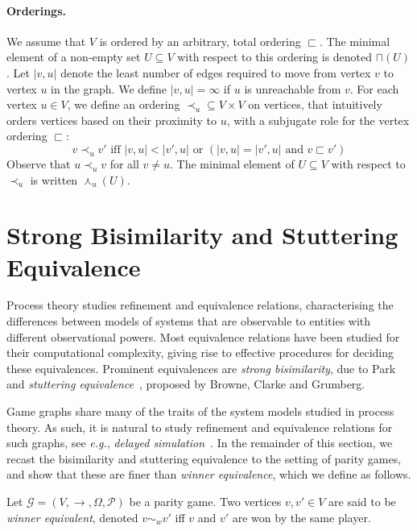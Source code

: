 \documentclass[a4paper]{llncs}
\newcommand{\eg}{\textit{e.g.}\xspace}
\newcommand{\game}{\ensuremath{\mathcal{G}}\xspace}
\newcommand{\priority}{\ensuremath{\Omega}\xspace}
\newcommand{\getplayername}{\ensuremath{\mathcal{P}}}
\newcommand{\winner}{\ensuremath{\sim_w}}
\newcommand{\vertexorder}{\ensuremath{\sqsubset}}
\newcommand{\targetorder}[1]{\ensuremath{\prec_{#1}}}
\newcommand{\vertexordermin}{\sqcap}
\newcommand{\targetordermin}[1]{\curlywedge_{#1}}
\begin{document}
\paragraph{Orderings.} We assume that $V$ is ordered by an arbitrary,
total ordering $\vertexorder$. The minimal element of a non-empty
set $U\subseteq V$ with respect to this ordering is denoted
$\vertexordermin(U)$.  Let $|v,u|$ denote the least number of edges
required to move from vertex $v$ to vertex $u$ in the graph. We define
$|v,u|=\infty$ if $u$ is unreachable from $v$. For each vertex $u \in V$,
we define an ordering $\targetorder{u} \subseteq V \times V$ on vertices,
that intuitively orders vertices based on their proximity to $u$, with a
subjugate role for the vertex ordering $\vertexorder$:
$$
v \targetorder{u} v' \textrm{ iff } |v,u| < |v',u|
\textrm{ or } (|v,u| = |v',u| \textrm{ and } v \vertexorder v')
$$
Observe that $u \targetorder{u} v$ for all $v \not= u$. The minimal
element of $U \subseteq V$ with respect to $\targetorder{u}$ is written
$\targetordermin{u}(U)$.


\section{Strong Bisimilarity and Stuttering Equivalence}
\label{sec:equivalences}

Process theory studies refinement and equivalence
relations, characterising the differences between models of systems that
are observable to entities with different observational powers. Most equivalence
relations have been studied for their computational complexity, giving
rise to effective procedures for deciding these equivalences.  Prominent
equivalences are \emph{strong bisimilarity}, due to Park~\cite{Par:81}
and \emph{stuttering equivalence}~\cite{BCG:88}, proposed by Browne,
Clarke and Grumberg.

Game graphs share many of the traits of the system models studied
in process theory. As such, it is natural to study refinement
and equivalence relations for such graphs, see \eg, \emph{delayed
simulation}~\cite{FW:06}. In the remainder of this section, we recast the
bisimilarity and stuttering equivalence to the setting
of parity games, and show that these are finer than \emph{winner equivalence},
which we define as follows.

\begin{definition} Let $\game = (V, \to, \priority, \getplayername)$ be
a parity game. Two vertices $v, v' \in V$ are said to
be \emph{winner equivalent}, denoted $v \winner v'$ iff
$v$ and $v'$ are won by the same player.
\end{definition}
\end{document}
